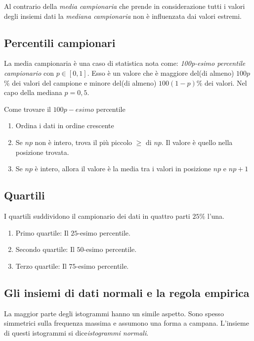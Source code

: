 \documentclass{article}
\begin{document}
Al contrario della \textit{media campionaria} che prende in considerazione tutti i valori degli insiemi dati la \textit{mediana campionaria} non è influenzata dai valori estremi.

\subsection*{Percentili campionari}

La media campionaria è una caso di statistica nota come: \textit{100p-esimo percentile campionario} con $p \in [0,1]$. Esso è un valore che è maggiore del(di almeno) $100p$\% dei valori del campione e minore del(di almeno) $100(1-p)\%$ dei valori. Nel capo della mediana $p=0,5$.

\begin{tcolorbox}
Come trovare il $100p-esimo$ percentile
  \begin{enumerate}
    \item Ordina i dati in ordine crescente
    \item Se $np$ non è intero, trova il più piccolo $\ge$ di $np$. Il valore è quello nella posizione trovata.
    \item Se $np$ è intero, allora il valore è la media tra i valori in posizione $np$ e $np+1$
  \end{enumerate}  
\end{tcolorbox}

\subsection*{Quartili}

I quartili suddividono il campionario dei dati in quattro parti $25\%$ l'una.

\begin{enumerate}
  \item Primo quartile: Il $25$-esimo percentile.
  \item Secondo quartile: Il $50$-esimo percentile.
  \item Terzo quartile: Il $75$-esimo percentile.
\end{enumerate}

\subsection*{Gli insiemi di dati normali e la regola empirica}

La maggior parte degli istogrammi hanno un simile aspetto. Sono spesso simmetrici sulla frequenza massima e assumono una forma a campana. L'insieme di questi istogrammi si dice\textit{istogrammi normali}.  
\end{document}
